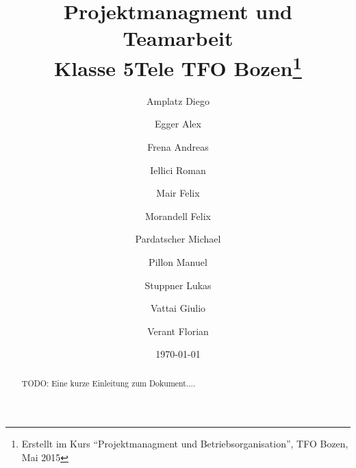 \documentclass[a4paper]{article}
\title{Projektmanagment und Teamarbeit\\Klasse 5Tele TFO Bozen\thanks{Erstellt 
im Kurs ``Projektmanagment und Betriebsorganisation'', TFO Bozen, Mai 2015}}
\author{Amplatz Diego
\and	Egger Alex
\and	Frena Andreas
\and	Iellici Roman
\and	Mair Felix
\and	Morandell Felix
\and	Pardatscher Michael
\and	Pillon Manuel
\and	Stuppner Lukas
\and	Vattai Giulio
\and	Verant Florian}
\begin{document}
\date{\today}

\maketitle

\begin{abstract}
 TODO: Eine kurze Einleitung zum Dokument....
\end{abstract}

\newpage


\begin{sloppypar}
\tableofcontents













\end{sloppypar}
\end{document}
